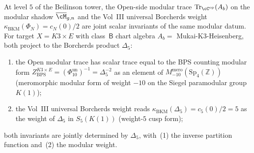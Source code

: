 \begin{lemma}
\label{lem:master-vertical-level-5}
At level $5$ of the Beilinson tower, the Open-side modular trace
$\mathrm{Tr}_{\cC^{\mathrm{op}}}(A_b)$ on the modular shadow
$\overline{\cM}_{g, n}$ and the Vol~III universal Borcherds weight
$\kappa_{\mathrm{BKM}}(\Phi_N) = c_N(0)/2$ are joint scalar
invariants of the same modular datum. For target
$X = K3 \times E$ with class~$\mathsf B$ chart algebra
$A_b = $ Mukai-K3-Heisenberg, both project to the Borcherds product
$\Delta_5$:
\begin{enumerate}[label=\textup{(\arabic*)}]
\item the Open modular trace has scalar trace equal to the BPS counting
modular form
$Z_{\mathrm{BPS}}^{K3 \times E} =
(\Phi_{10}^{\mathrm{un}})^{-1} = \Delta_5^{-2}$ as an element of
$M_{-10}^{\mathrm{mero}}(\mathrm{Sp}_4(\mathbb Z))$
\textup{(}meromorphic modular form of weight $-10$ on
the Siegel paramodular group $K(1)$\textup{);}
\item the Vol~III universal Borcherds weight reads
$\kappa_{\mathrm{BKM}}(\Delta_5) = c_5(0)/2 = 5$ as the weight of
$\Delta_5$ in $S_5(K(1))$
\textup{(}weight-$5$ cusp form\textup{);}
\end{enumerate}
both invariants are jointly determined by $\Delta_5$, with~\textup{(1)}
the inverse partition function and~\textup{(2)} the modular weight.
\end{lemma}

